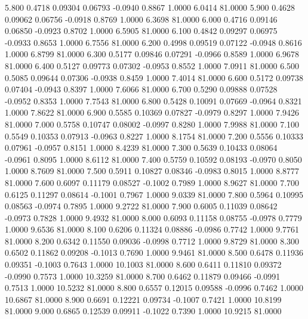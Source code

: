   5.800   0.4718   0.09304   0.06793  -0.0940   0.8867   1.0000   6.0414  81.0000
   5.900   0.4628   0.09062   0.06756  -0.0918   0.8769   1.0000   6.3698  81.0000
   6.000   0.4716   0.09146   0.06850  -0.0923   0.8702   1.0000   6.5905  81.0000
   6.100   0.4842   0.09297   0.06975  -0.0933   0.8653   1.0000   6.7556  81.0000
   6.200   0.4998   0.09519   0.07122  -0.0948   0.8616   1.0000   6.8799  81.0000
   6.300   0.5177   0.09846   0.07291  -0.0966   0.8589   1.0000   6.9678  81.0000
   6.400   0.5127   0.09773   0.07302  -0.0953   0.8552   1.0000   7.0911  81.0000
   6.500   0.5085   0.09644   0.07306  -0.0938   0.8459   1.0000   7.4014  81.0000
   6.600   0.5172   0.09738   0.07404  -0.0943   0.8397   1.0000   7.6066  81.0000
   6.700   0.5290   0.09888   0.07528  -0.0952   0.8353   1.0000   7.7543  81.0000
   6.800   0.5428   0.10091   0.07669  -0.0964   0.8321   1.0000   7.8622  81.0000
   6.900   0.5585   0.10369   0.07827  -0.0979   0.8297   1.0000   7.9426  81.0000
   7.000   0.5758   0.10747   0.08002  -0.0997   0.8280   1.0000   7.9988  81.0000
   7.100   0.5549   0.10353   0.07913  -0.0963   0.8227   1.0000   8.1754  81.0000
   7.200   0.5556   0.10333   0.07961  -0.0957   0.8151   1.0000   8.4239  81.0000
   7.300   0.5639   0.10433   0.08064  -0.0961   0.8095   1.0000   8.6112  81.0000
   7.400   0.5759   0.10592   0.08193  -0.0970   0.8050   1.0000   8.7609  81.0000
   7.500   0.5911   0.10827   0.08346  -0.0983   0.8015   1.0000   8.8777  81.0000
   7.600   0.6097   0.11179   0.08527  -0.1002   0.7989   1.0000   8.9627  81.0000
   7.700   0.6125   0.11297   0.08614  -0.1001   0.7967   1.0000   9.0339  81.0000
   7.800   0.5964   0.10995   0.08563  -0.0974   0.7895   1.0000   9.2722  81.0000
   7.900   0.6005   0.11039   0.08642  -0.0973   0.7828   1.0000   9.4932  81.0000
   8.000   0.6093   0.11158   0.08755  -0.0978   0.7779   1.0000   9.6536  81.0000
   8.100   0.6206   0.11324   0.08886  -0.0986   0.7742   1.0000   9.7761  81.0000
   8.200   0.6342   0.11550   0.09036  -0.0998   0.7712   1.0000   9.8729  81.0000
   8.300   0.6502   0.11862   0.09208  -0.1013   0.7690   1.0000   9.9461  81.0000
   8.500   0.6478   0.11936   0.09351  -0.1003   0.7643   1.0000  10.1003  81.0000
   8.600   0.6411   0.11810   0.09372  -0.0990   0.7573   1.0000  10.3259  81.0000
   8.700   0.6462   0.11879   0.09466  -0.0991   0.7513   1.0000  10.5232  81.0000
   8.800   0.6557   0.12015   0.09588  -0.0996   0.7462   1.0000  10.6867  81.0000
   8.900   0.6691   0.12221   0.09734  -0.1007   0.7421   1.0000  10.8199  81.0000
   9.000   0.6865   0.12539   0.09911  -0.1022   0.7390   1.0000  10.9215  81.0000
